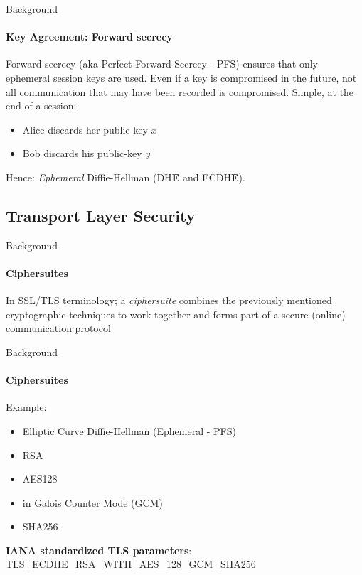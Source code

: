 \documentclass[hyperref={draft}]{beamer}
\begin{document}
\begin{frame}{Background}
  \framesubtitle{Key Agreement: Forward secrecy}
  Forward secrecy (aka Perfect Forward Secrecy - PFS) ensures that only ephemeral session keys are used.
  \newline
  \newline
  Even if a key is compromised in the future, not all communication that may have been recorded is compromised.
  \newline
  \newline
  Simple, at the end of a session:
  \begin{itemize}
    \item Alice discards her public-key $x$
    \item Bob discards his public-key $y$
  \end{itemize}
  Hence: \emph{Ephemeral} Diffie-Hellman (DH\textbf{E} and ECDH\textbf{E}).
\end{frame}

\subsection{Transport Layer Security}

\begin{frame}{Background}
  \framesubtitle{Ciphersuites}
  In SSL/TLS terminology; a \emph{ciphersuite} combines the previously mentioned cryptographic techniques to work together and forms part of a secure (online) communication protocol
\end{frame}

\begin{frame}{Background}
  \framesubtitle{Ciphersuites}
  Example:
  \begin{itemize}
    \item Elliptic Curve Diffie-Hellman (Ephemeral - PFS)
    \item RSA
    \item AES128
    \item in Galois Counter Mode (GCM)
    \item SHA256
  \end{itemize}
  \textbf{IANA standardized TLS parameters}:\\
  TLS\_ECDHE\_RSA\_WITH\_AES\_128\_GCM\_SHA256 
\end{frame}
\end{document}
